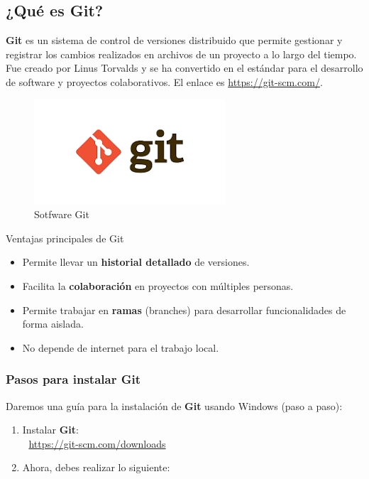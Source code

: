 \documentclass[
]{book}
\providecommand{\tightlist}{%
  \setlength{\itemsep}{0pt}\setlength{\parskip}{0pt}}
\begin{document}
\subsection{¿Qué es Git?}\label{quuxe9-es-git}

\textbf{Git} es un sistema de control de versiones distribuido que permite gestionar y registrar los cambios realizados en archivos de un proyecto a lo largo del tiempo. Fue creado por Linus Torvalds y se ha convertido en el estándar para el desarrollo de software y proyectos colaborativos. El enlace es \url{https://git-scm.com/}.

\begin{figure}

{\centering \includegraphics[width=0.4\linewidth]{images/git} 

}

\caption{Sotfware Git}\label{fig:git-fig}
\end{figure}

{} Ventajas principales de Git

\begin{itemize}
\tightlist
\item
  Permite llevar un \textbf{historial detallado} de versiones.
\item
  Facilita la \textbf{colaboración} en proyectos con múltiples personas.
\item
  Permite trabajar en \textbf{ramas} (branches) para desarrollar funcionalidades de forma aislada.
\item
  No depende de internet para el trabajo local.
\end{itemize}

\subsubsection{Pasos para instalar Git}\label{pasos-para-instalar-git}

Daremos una guía para la instalación de \textbf{Git} usando Windows (paso a paso):

\begin{enumerate}
\def\labelenumi{\arabic{enumi}.}
\item
  Instalar \textbf{Git}:\\
  🔗 \url{https://git-scm.com/downloads}
\item
  Ahora, debes realizar lo siguiente:
\end{enumerate}
\end{document}
